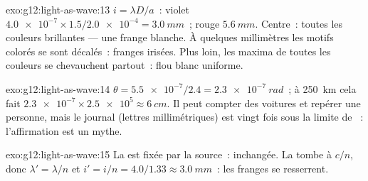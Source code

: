 \begin{solution}{exo:g12:light-as-wave:13}
$i = \lambda D/a$~: violet $\num{4.0e-7} \times 1.5/\num{2.0e-4} =
\qty{3.0}{mm}$~; rouge $\qty{5.6}{mm}$. Centre~: toutes les couleurs
brillantes --- une frange blanche. À quelques millimètres les motifs
colorés se sont décalés~: franges irisées. Plus loin, les maxima de
toutes les couleurs se chevauchent partout~: flou blanc uniforme.
\end{solution}

\begin{solution}{exo:g12:light-as-wave:14}
$\theta = \num{5.5e-7}/2.4 = \qty{2.3e-7}{rad}$~; à \qty{250}{km}
cela fait $\num{2.3e-7} \times \num{2.5e5} \approx \qty{6}{cm}$. Il
peut compter des voitures et repérer une personne, mais le journal
(lettres millimétriques) est vingt fois sous la limite de
~: l'affirmation est un mythe.
\end{solution}

\begin{solution}{exo:g12:light-as-wave:15}
La  est fixée par la source~: inchangée. La 
tombe à $c/n$, donc $\lambda' = \lambda/n$ et
$i' = i/n = 4.0/1.33 \approx \qty{3.0}{mm}$~: les franges se resserrent.
\end{solution}

